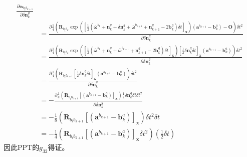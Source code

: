 \documentclass[oneside]{article}
\begin{document}
\begin{align}
    \frac{\partial \boldsymbol{\alpha}_{b_{i} b_{k+1}}}{\partial \delta \mathbf{n}_{k}^{g}}    \\
&= \frac{\partial\frac{1}{4}\left(\mathbf{R}_{b_{i} b_{k}}
    \exp \left( \left[ \frac{1}{2}(\mathbf{\overline{\omega}}^{b_k} + \mathbf{n}_k^g + \delta \mathbf{n}_k^g + \mathbf{\overline{\omega}}^{b_{k + 1}} + \mathbf{n}_{k+1}^g- 2\mathbf{b}_k^g) \delta t \right]_{\mathbf{x}} \right)
     \left({\mathbf{a}}^{b_{k+1}}-\mathbf{b}_{k}^{a}\right) - \mathbf{O} \right) \delta t^2}{\partial \delta \mathbf{n}_{k}^{g}} \\
&= \frac{\partial\frac{1}{4}\left(\mathbf{R}_{b_{i} b_{k}}
     \exp \left( \left[ \frac{1}{2}(\mathbf{\overline{\omega}}^{b_k} + \mathbf{n}_k^g + \mathbf{\overline{\omega}}^{b_{k + 1}} + \mathbf{n}_{k+1}^g- 2\mathbf{b}_k^g) \delta t \right]_{\mathbf{x}} \right)
     \left[\frac{1}{2}\delta \mathbf{n}_k^g \delta t \right]_\mathbf{x}
      \left({\mathbf{a}}^{b_{k+1}}-\mathbf{b}_{k}^{a}\right) \right) \delta t^2}{\partial \delta \mathbf{n}_{k}^{g}} \\
&= \frac{\partial\frac{1}{4}\left(\mathbf{R}_{b_{i} b_{k+1}}
  \left[\frac{1}{2}\delta \mathbf{n}_k^g \delta t \right]_\mathbf{x}
   \left({\mathbf{a}}^{b_{k+1}}-\mathbf{b}_{k}^{a}\right) \right)   \delta t^2}{\partial \delta \mathbf{n}_{k}^{g}}  \\
&= -\frac{\partial\frac{1}{4}\left(\mathbf{R}_{b_{i} b_{k+1}}
   \left[ \left({\mathbf{a}}^{b_{k+1}}-\mathbf{b}_{k}^{a}\right) \right]_\mathbf{x}
     \right)  \frac{1}{2}\delta \mathbf{n}_k^g \delta t
      \delta t^2}{\partial \delta \mathbf{n}_{k}^{g}}    \\
&= -\frac{1}{8}\left(\mathbf{R}_{b_{i} b_{k+1}}
    \left[ \left({\mathbf{a}}^{b_{k+1}}-\mathbf{b}_{k}^{a}\right) \right]_\mathbf{x}
      \right)   \delta t^2  \delta t  \\
&=-\frac{1}{4}\left(\mathbf{R}_{b_{i} b_{k+1}}\left[\left(\mathbf{a}^{b_{k+1}}-\mathbf{b}_{k}^{a}\right)\right]_\mathbf{x} \delta t^{2}\right)\left(\frac{1}{2} \delta t\right)
\end{align} 
因此PPT的$g_{32}$得证。
\end{document}
